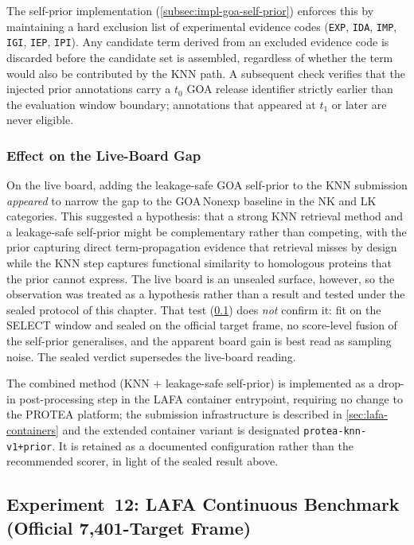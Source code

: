 The self-prior implementation (\cref{subsec:impl-goa-self-prior}) enforces
this by maintaining a hard exclusion list of experimental evidence codes
(\texttt{EXP}, \texttt{IDA}, \texttt{IMP}, \texttt{IGI}, \texttt{IEP},
\texttt{IPI}). Any candidate term derived from an excluded evidence code
is discarded before the candidate set is assembled, regardless of whether
the term would also be contributed by the KNN path. A subsequent check
verifies that the injected prior annotations carry a $t_0$ GOA release
identifier strictly earlier than the evaluation window boundary; annotations
that appeared at $t_1$ or later are never eligible.

\subsubsection{Effect on the Live-Board Gap}

On the live board, adding the leakage-safe GOA self-prior to the KNN submission
\emph{appeared} to narrow the gap to the GOA\,Nonexp baseline in the NK and LK
categories. This suggested a hypothesis: that a strong KNN retrieval method and a
leakage-safe self-prior might be complementary rather than competing, with the
prior capturing direct term-propagation evidence that retrieval misses by design
while the KNN step captures functional similarity to homologous proteins that the
prior cannot express. The live board is an unsealed surface, however, so the
observation was treated as a hypothesis rather than a result and tested under the
sealed protocol of this chapter. That test (\cref{subsec:exp12-lafa}) does
\emph{not} confirm it: fit on the SELECT window and sealed on the official target
frame, no score-level fusion of the self-prior generalises, and the apparent
board gain is best read as sampling noise. The sealed verdict supersedes the
live-board reading.

The combined method (KNN + leakage-safe self-prior) is implemented as a drop-in
post-processing step in the LAFA container entrypoint, requiring no change to the
PROTEA platform; the submission infrastructure is described in
\cref{sec:lafa-containers} and the extended container variant is designated
\texttt{protea-knn-v1+prior}. It is retained as a documented configuration rather
than the recommended scorer, in light of the sealed result above.

\subsection{Experiment~12: LAFA Continuous Benchmark (Official 7{,}401-Target Frame)}
\label{subsec:exp12-lafa}

